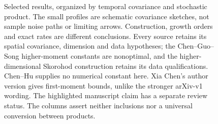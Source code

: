 \begin{figure}
  \centering
  
  \caption[Source-qualified literature comparison]{Selected results, organized
    by temporal covariance and stochastic product. The small profiles are
    schematic covariance sketches, not sample noise paths or limiting arrows.
    Construction, growth orders and exact rates are different conclusions.
    Every source retains its spatial covariance, dimension and data hypotheses;
    the Chen--Guo--Song higher-moment constants are nonoptimal, and the
    higher-dimensional Skorohod construction retains its data qualifications.
    Chen--Hu supplies no numerical constant here. Xia Chen's author
    version gives first-moment bounds, unlike the stronger arXiv-v1 wording.
    The highlighted manuscript claim has a separate review status. The columns
    assert neither inclusions nor a universal conversion between products.}
  \label{Fig:literature-results-map}
\end{figure}
